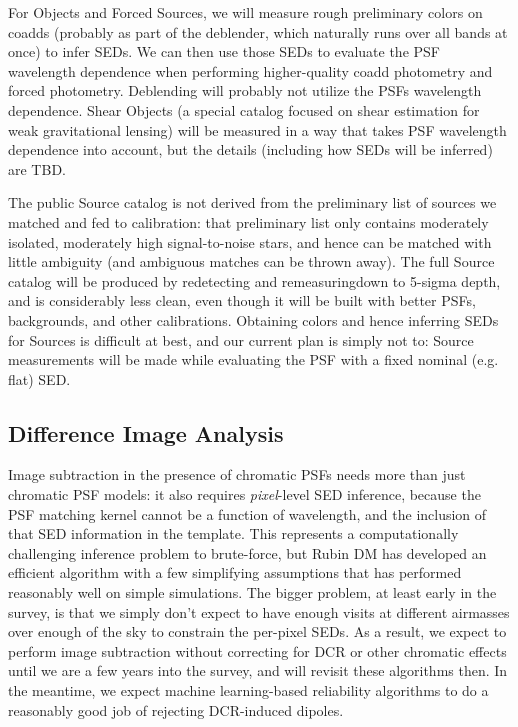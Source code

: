 \documentclass[DM,authoryear,toc]{lsstdoc}
\begin{document}
For Objects and Forced Sources, we will measure rough preliminary colors on coadds (probably as part of the deblender, which naturally runs over all bands at once) to infer SEDs.
We can then use those SEDs to evaluate the PSF wavelength dependence when performing higher-quality coadd photometry and forced photometry.
Deblending will probably not utilize the PSFs wavelength dependence.
Shear Objects (a special catalog focused on shear estimation for weak gravitational lensing) will be measured in a way that takes PSF wavelength dependence into account, but the details (including how SEDs will be inferred) are TBD.

The public Source catalog is not derived from the preliminary list of sources we matched and fed to calibration: that preliminary list only contains moderately isolated, moderately high signal-to-noise stars, and hence can be matched with little ambiguity (and ambiguous matches can be thrown away).
The full Source catalog will be produced by redetecting and remeasuringdown to 5-sigma depth, and is considerably less clean, even though it will be built with better PSFs, backgrounds, and other calibrations.
Obtaining colors and hence inferring SEDs for Sources is difficult at best, and our current plan is simply not to: Source measurements will be made while evaluating the PSF with a fixed nominal (e.g. flat) SED.

\subsection{Difference Image Analysis}


Image subtraction in the presence of chromatic PSFs needs more than just chromatic PSF models: it also requires \emph{pixel}-level SED inference, because the PSF matching kernel cannot be a function of wavelength, and the inclusion of that SED information in the template.
This represents a computationally challenging inference problem to brute-force, but Rubin DM has developed an efficient algorithm with a few simplifying assumptions \citep{DMTN-037, DMTN-121} that has performed reasonably well on simple simulations.
The bigger problem, at least early in the survey, is that we simply don't expect to have enough visits at different airmasses over enough of the sky to constrain the per-pixel SEDs.
As a result, we expect to perform image subtraction without correcting for DCR or other chromatic effects until we are a few years into the survey, and will revisit these algorithms then.
In the meantime, we expect machine learning-based reliability algorithms to do a reasonably good job of rejecting DCR-induced dipoles.
\end{document}
